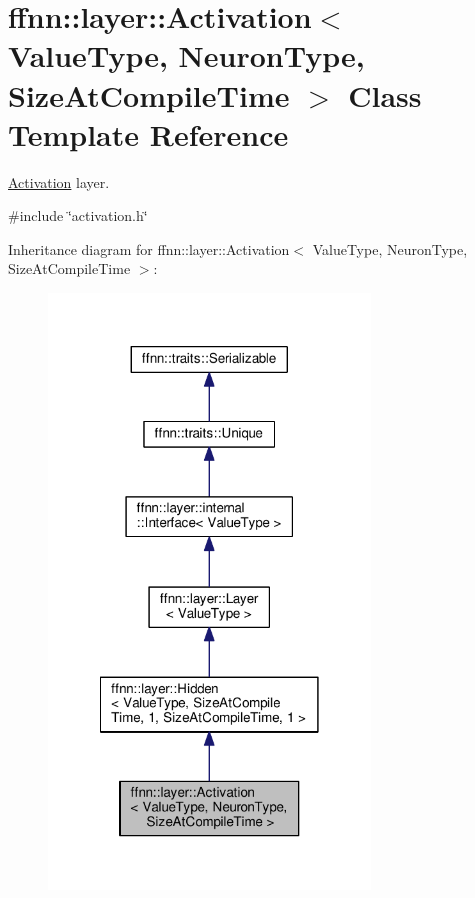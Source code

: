 \hypertarget{classffnn_1_1layer_1_1_activation}{\section{ffnn\-:\-:layer\-:\-:Activation$<$ Value\-Type, Neuron\-Type, Size\-At\-Compile\-Time $>$ Class Template Reference}
\label{classffnn_1_1layer_1_1_activation}
}


\hyperlink{classffnn_1_1layer_1_1_activation}{Activation} layer.  




{\ttfamily \#include \char`\"{}activation.\-h\char`\"{}}



Inheritance diagram for ffnn\-:\-:layer\-:\-:Activation$<$ Value\-Type, Neuron\-Type, Size\-At\-Compile\-Time $>$\-:
\nopagebreak
\begin{figure}[H]
\begin{center}
\leavevmode
\includegraphics[width=242pt]{classffnn_1_1layer_1_1_activation__inherit__graph}
\end{center}
\end{figure}


